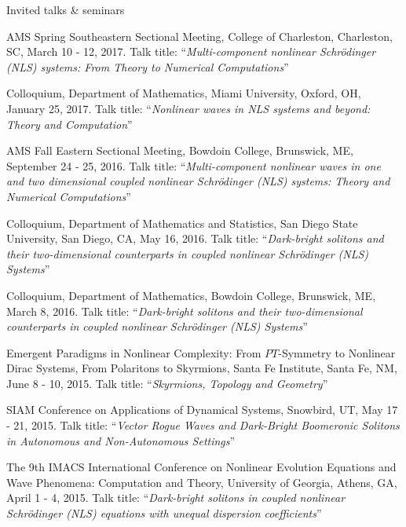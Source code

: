 \documentclass[10pt]{article} %
\begin{document}
\begin{section}{Invited talks \& seminars}
\begin{etaremune}
\item   AMS Spring Southeastern Sectional Meeting, College of Charleston, Charleston, SC, March 10 - 12, 2017.
        Talk title: ``\textit{Multi-component nonlinear Schr\"odinger (NLS) systems: From Theory to Numerical Computations}''   

\item   Colloquium, Department of Mathematics, Miami University, Oxford, OH, January 25, 2017.
        Talk title: ``\textit{Nonlinear waves in NLS systems and beyond: Theory and Computation}''

\item   AMS Fall Eastern Sectional Meeting, Bowdoin College, Brunswick, ME, September 24 - 25, 2016.
        Talk title: ``\textit{Multi-component nonlinear waves in one and two dimensional coupled nonlinear
        Schr\"odinger (NLS) systems: Theory and Numerical Computations}''
    
\item   Colloquium, Department of Mathematics and Statistics, San Diego State University, San Diego, CA, May 16, 2016.
        Talk title: ``\textit{Dark-bright solitons and their two-dimensional counterparts in coupled nonlinear Schr\"odinger (NLS) Systems}''

\item   Colloquium, Department of Mathematics, Bowdoin College, Brunswick, ME, March 8, 2016.
        Talk title: ``\textit{Dark-bright solitons and their two-dimensional counterparts in coupled nonlinear Schr\"odinger (NLS) Systems}''
    
\item   Emergent Paradigms in Nonlinear Complexity: From $PT$-Symmetry to Nonlinear Dirac Systems, From Polaritons to Skyrmions, %
        Santa Fe Institute, Santa Fe, NM, June 8 - 10, 2015. Talk title: ``\textit{Skyrmions, Topology and Geometry}''

\item   SIAM Conference on Applications of Dynamical Systems, Snowbird, UT, May 17 - 21, 2015. Talk title: %
        ``\textit{Vector Rogue Waves and Dark-Bright Boomeronic Solitons in Autonomous and Non-Autonomous Settings}''

\item   The 9th IMACS International Conference on Nonlinear Evolution Equations and Wave Phenomena: Computation and Theory, %
        University of Georgia, Athens, GA, April 1 - 4, 2015. Talk title: %
        ``\textit{Dark-bright solitons in coupled nonlinear Schr\"odinger (NLS) equations with unequal dispersion coefficients}''      
   

\end{etaremune}
\end{section}
\end{document}
